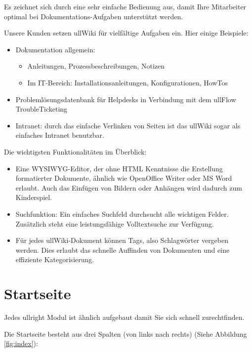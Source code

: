 \documentclass[article, a4paper, oneside, 11pt]{memoir}
\begin{document}
Es zeichnet sich durch eine sehr einfache Bedienung aus, damit Ihre Mitarbeiter optimal bei Dokumentations-Aufgaben unterstützt werden. 

Unsere Kunden setzen ullWiki für vielfältige Aufgaben ein. Hier einige Beispiele:

\begin{itemize}
\item Dokumentation allgemein:

\begin{itemize}
\item Anleitungen, Prozessbeschreibungen, Notizen
\item Im IT-Bereich: Installationsanleitungen, Konfigurationen, HowTos
\end{itemize}

\item Problemlösungsdatenbank für Helpdesks in Verbindung mit dem ullFlow TroubleTicketing
\item Intranet: durch das einfache Verlinken von Seiten ist das ullWiki sogar als einfaches Intranet benutzbar.
\end{itemize}

Die wichtigsten Funktionalitäten im Überblick:

\begin{itemize}
\item Eine WYSIWYG-Editor, der ohne HTML Kenntnisse die Erstellung formatierter Dokumente, ähnlich wie OpenOffice Writer oder MS Word erlaubt. Auch das Einfügen von Bildern oder Anhängen wird dadurch zum Kinderspiel.
\item Suchfunktion: Ein einfaches Suchfeld durchsucht alle wichtigen Felder. Zusätzlich steht eine leistungsfähige Volltextsuche zur Verfügung.
\item Für jedes ullWiki-Dokument können Tags, also Schlagwörter vergeben werden. Dies erlaubt das schnelle Auffinden von Dokumenten und eine effiziente Kategorisierung.
\end{itemize}




\section{Startseite}

Jedes ullright Modul ist ähnlich aufgebaut damit Sie sich schnell zurechtfinden.

Die Startseite besteht aus drei Spalten (von links nach rechts) (Siehe Abbildung \vref{fig:index}):
\end{document}
